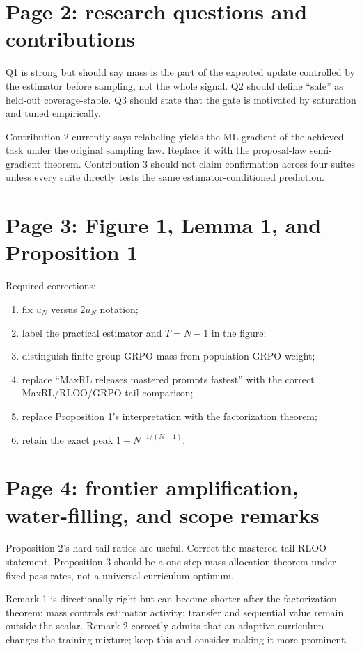 \documentclass[11pt]{article}
\theoremstyle{definition}
\theoremstyle{remark}
\begin{document}
\section{Page 2: research questions and contributions}

Q1 is strong but should say mass is the part of the expected update controlled by the estimator before sampling, not the whole signal. Q2 should define ``safe'' as held-out coverage-stable. Q3 should state that the gate is motivated by saturation and tuned empirically.

Contribution 2 currently says relabeling yields the ML gradient of the achieved task under the original sampling law. Replace it with the proposal-law semi-gradient theorem. Contribution 3 should not claim confirmation across four suites unless every suite directly tests the same estimator-conditioned prediction.

\section{Page 3: Figure 1, Lemma 1, and Proposition 1}

Required corrections:

\begin{enumerate}[leftmargin=2em]
\item fix $u_N$ versus $2u_N$ notation;
\item label the practical estimator and $T=N-1$ in the figure;
\item distinguish finite-group GRPO mass from population GRPO weight;
\item replace ``MaxRL releases mastered prompts fastest'' with the correct MaxRL/RLOO/GRPO tail comparison;
\item replace Proposition 1's interpretation with the factorization theorem;
\item retain the exact peak $1-N^{-1/(N-1)}$.
\end{enumerate}

\section{Page 4: frontier amplification, water-filling, and scope remarks}

Proposition 2's hard-tail ratios are useful. Correct the mastered-tail RLOO statement. Proposition 3 should be a one-step mass allocation theorem under fixed pass rates, not a universal curriculum optimum.

Remark 1 is directionally right but can become shorter after the factorization theorem: mass controls estimator activity; transfer and sequential value remain outside the scalar. Remark 2 correctly admits that an adaptive curriculum changes the training mixture; keep this and consider making it more prominent.
\end{document}
